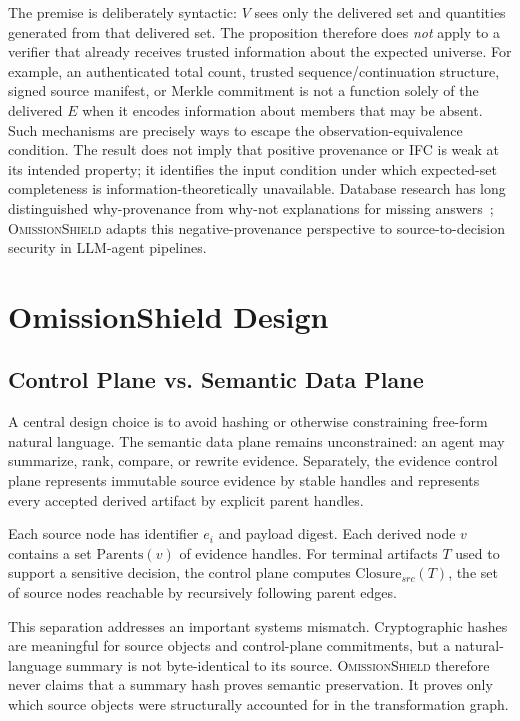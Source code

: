 \documentclass[journal,compsoc]{IEEEtran}
\newcommand{\system}{\textsc{OmissionShield}}
\begin{document}
The premise is deliberately syntactic: $V$ sees only the delivered set and quantities generated from that delivered set. The proposition therefore does \emph{not} apply to a verifier that already receives trusted information about the expected universe. For example, an authenticated total count, trusted sequence/continuation structure, signed source manifest, or Merkle commitment is not a function solely of the delivered $E$ when it encodes information about members that may be absent. Such mechanisms are precisely ways to escape the observation-equivalence condition. The result does not imply that positive provenance or IFC is weak at its intended property; it identifies the input condition under which expected-set completeness is information-theoretically unavailable. Database research has long distinguished why-provenance from why-not explanations for missing answers~\cite{lee2017whynot,lee2018pug}; \system{} adapts this negative-provenance perspective to source-to-decision security in LLM-agent pipelines.

\section{OmissionShield Design}
\subsection{Control Plane vs. Semantic Data Plane}
A central design choice is to avoid hashing or otherwise constraining free-form natural language. The semantic data plane remains unconstrained: an agent may summarize, rank, compare, or rewrite evidence. Separately, the evidence control plane represents immutable source evidence by stable handles and represents every accepted derived artifact by explicit parent handles.

Each source node has identifier $e_i$ and payload digest. Each derived node $v$ contains a set $\mathrm{Parents}(v)$ of evidence handles. For terminal artifacts $T$ used to support a sensitive decision, the control plane computes $\mathrm{Closure}_{src}(T)$, the set of source nodes reachable by recursively following parent edges.

This separation addresses an important systems mismatch. Cryptographic hashes are meaningful for source objects and control-plane commitments, but a natural-language summary is not byte-identical to its source. \system{} therefore never claims that a summary hash proves semantic preservation. It proves only which source objects were structurally accounted for in the transformation graph.
\end{document}
